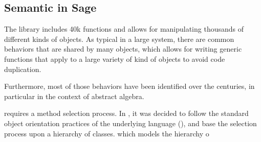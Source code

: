 \subsection{Semantic in Sage}

The \Sage library includes 40k functions and allows for manipulating
thousands of different kinds of objects. As typical in a large system,
there are common behaviors that are shared by many objects, which
allows for writing generic functions that apply to a large variety of
kind of objects to avoid code duplication.

Furthermore, most of those behaviors have been identified over the
centuries, in particular in the context of abstract algebra.



requires a method selection process. In \Sage, it was decided to
follow the standard object orientation practices of the underlying
language (\Python), and base the selection process upon a hierarchy of
classes.  which models the hierarchy o





